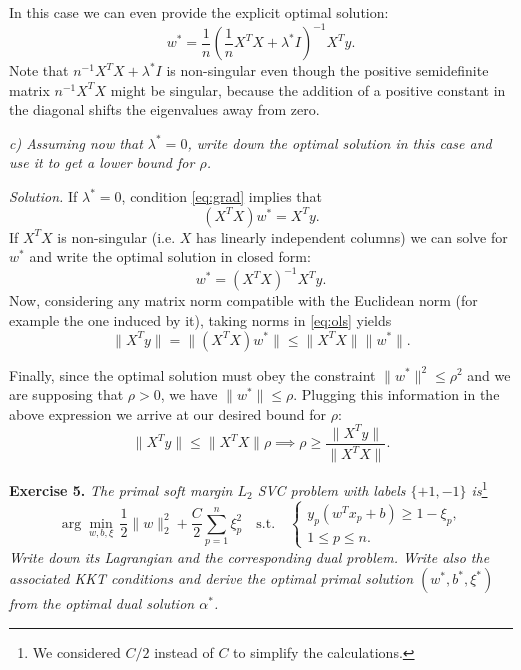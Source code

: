\documentclass[11pt]{article}
\begin{document}
In this case we can even provide the explicit optimal solution:
\[
w^* = \frac{1}{n}\left(\frac{1}{n}X^TX + \lambda^* I\right)^{-1}X^Ty.
\]
Note that $n^{-1}X^TX+\lambda^* I$ is non-singular even though the positive semidefinite matrix $n^{-1}X^TX$ might be singular, because the addition of a positive constant in the diagonal shifts the eigenvalues away from zero.

\textit{c) Assuming now that $\lambda^*=0$, write down the optimal solution in this case and use it to get a lower bound for $\rho$.}

\textit{Solution.} If $\lambda^*=0$, condition \eqref{eq:grad} implies that
\begin{equation}
  \label{eq:ols}
(X^TX)w^*= X^Ty.
\end{equation}
If $X^TX$ is non-singular (i.e. $X$ has linearly independent columns) we can solve for $w^*$ and write the optimal solution in closed form:
\[
w^*=(X^TX)^{-1}X^Ty.
\]
Now, considering any matrix norm compatible with the Euclidean norm (for example the one induced by it), taking norms in \eqref{eq:ols} yields
\[
\|X^Ty\|=\|(X^TX)w^*\|\leq \|X^TX\|\|w^*\|.
\]

Finally, since the optimal solution must obey the constraint $\|w^*\|^2\leq \rho^2$ and we are supposing that $\rho>0$, we have $\|w^*\|\leq \rho$. Plugging this information in the above expression we arrive at our desired bound for $\rho$:
\[
\|X^Ty\|\leq \|X^TX\|\rho \implies \rho \geq \frac{\|X^Ty\|}{\|X^TX\|}.
\]


\textbf{Exercise 5.} \textit{The primal soft margin $L_2$ SVC problem with labels $\{+1,-1\}$ is}\footnote{We considered $C/2$ instead of $C$ to simplify the calculations.}
\[
\arg\min_{w,b,\xi}\, \frac{1}{2} \|w\|_2^2 + \frac{C}{2}\sum_{p=1}^n \xi_p^2\quad \text{s.t.}\quad \begin{cases}
  y_p(w^Tx_p+b) \geq 1-\xi_p,\\
  1 \leq p \leq n.
\end{cases}
\]
\textit{Write down its Lagrangian and the corresponding dual problem. Write also the associated KKT conditions and derive the optimal primal solution $(w^*, b^*, \xi^*)$ from the optimal dual solution $\alpha^*$.}
\end{document}
